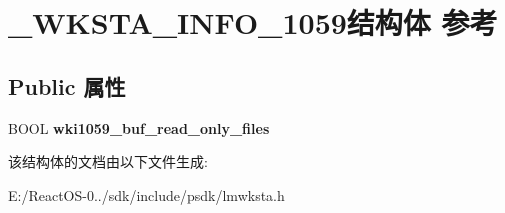 \hypertarget{struct___w_k_s_t_a___i_n_f_o__1059}{}\section{\+\_\+\+W\+K\+S\+T\+A\+\_\+\+I\+N\+F\+O\+\_\+1059结构体 参考}
\label{struct___w_k_s_t_a___i_n_f_o__1059}
\subsection*{Public 属性}
\begin{DoxyCompactItemize}
\item 
\mbox{\label{struct___w_k_s_t_a___i_n_f_o__1059_adfe6be431dca31c7a9ed2d6163a5433f}} 
B\+O\+OL {\bfseries wki1059\+\_\+buf\+\_\+read\+\_\+only\+\_\+files}
\end{DoxyCompactItemize}


该结构体的文档由以下文件生成\+:\begin{DoxyCompactItemize}
\item 
E\+:/\+React\+O\+S-\/0../sdk/include/psdk/lmwksta.\+h\end{DoxyCompactItemize}
